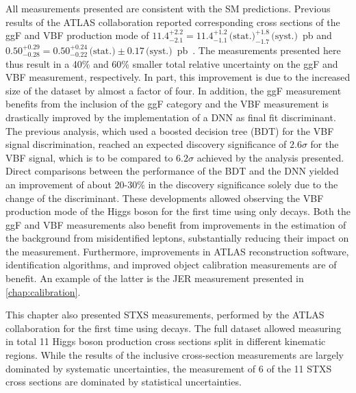 All measurements presented are consistent with the SM predictions. 
Previous \RunTwo results of the ATLAS collaboration reported corresponding cross sections of the ggF and VBF production mode of $11.4^{+2.2}_{-2.1} = 11.4^{+1.2}_{-1.1}\,\text{(stat.)}^{+1.8}_{-1.7}\,\text{(syst.)}$~pb and $0.50^{+0.29}_{-0.28} = 0.50^{+0.24}_{-0.22}\,\text{(stat.)}\pm 0.17\,\text{(syst.)}$~pb~\cite{HIGG-2016-07}.
The measurements presented here thus result in a 40\% and 60\% smaller total relative uncertainty on the ggF and VBF measurement, respectively. In part, this improvement is due to the increased size of the dataset by almost a factor of four.
In addition, the ggF measurement benefits from the inclusion of the ggF \TwoJet category and the VBF measurement is drastically improved by the implementation of a DNN as final fit discriminant. 
The previous analysis, which used a boosted decision tree (BDT) for the VBF signal discrimination, reached an expected discovery significance of $2.6\sigma$ for the VBF signal, which is to be compared to $6.2\sigma$ achieved by the analysis presented. 
Direct comparisons between the performance of the BDT and the DNN yielded an improvement of about 20-30\% in the discovery significance solely due to the change of the discriminant. 
These developments allowed observing the VBF production mode of the Higgs boson for the first time using only \HWW decays.
Both the ggF and VBF measurements also benefit from improvements in the estimation of the background from misidentified leptons, substantially reducing their impact on the measurement. 
Furthermore, improvements in ATLAS reconstruction software, identification algorithms, and improved object calibration measurements are of benefit. 
An example of the latter is the JER measurement presented in \cref{chap:calibration}. 

This chapter also presented STXS measurements, performed by the ATLAS collaboration for the first time using \HWW decays. 
The full \RunTwo dataset allowed measuring in total 11 Higgs boson production cross sections split in different kinematic regions. 
While the results of the inclusive cross-section measurements are largely dominated by systematic uncertainties, the measurement of 6 of the 11 STXS cross sections are dominated by statistical uncertainties. 

